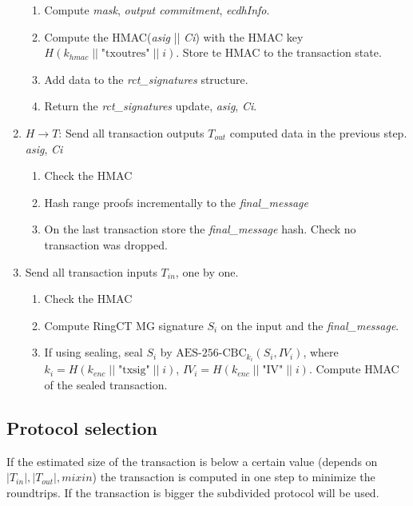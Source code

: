 \documentclass[]{article}
\begin{document}
\begin{enumerate}
\begin{enumerate}
		\item Compute \emph{mask}, \emph{output commitment}, \emph{ecdhInfo}.
		
		\item Compute the HMAC(\emph{asig} || \emph{Ci}) with the HMAC key $H(k_{hmac} \; || \; \text{"txoutres"} \; || \; i)$. Store te HMAC to the transaction state.
		
		\item Add data to the \emph{rct\_signatures} structure.
		
		\item Return the \emph{rct\_signatures} update, \emph{asig}, \emph{Ci}.
	\end{enumerate}

	\item $H \rightarrow T$: Send all transaction outputs $T_{out}$ computed data in the previous step. \emph{asig}, \emph{Ci}
	\begin{enumerate}
		\item Check the HMAC
		
		\item Hash range proofs incrementally to the \emph{final\_message}
		
		\item On the last transaction store the \emph{final\_message} hash. Check no transaction was dropped.
	\end{enumerate}

	\item Send all transaction inputs $T_{in}$, one by one.
	\begin{enumerate}
		\item Check the HMAC
		
		\item Compute RingCT MG signature $S_i$ on the input and the \emph{final\_message}.
		
		\item If using sealing, seal $S_i$ by $\text{AES-256-CBC}_{k_i}(S_i, IV_i)$, where $k_i = H(k_{enc} \; || \; \text{"txsig"} \; || \; i)$, $IV_i = H(k_{enc} \; || \; \text{"IV"} \; || \; i)$. Compute HMAC of the sealed transaction.
	\end{enumerate} 
	
\end{enumerate}

\subsection{Protocol selection}
If the estimated size of the transaction is below a certain value (depends on $|T_{in}|, |T_{out}|, mixin$) the transaction is computed in one step to minimize the roundtrips. If the transaction is bigger the subdivided protocol will be used.
\end{document}
